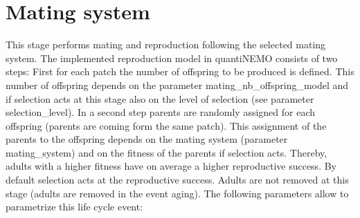 \documentclass[letterpaper,12pt,oneside]{book}
\begin{document}
\section{Mating system}\label{chap:breeding}
This stage performs mating and reproduction following the selected mating system. The implemented reproduction model in quantiNEMO consists of two steps: First for each patch the number of offspring to be produced is defined. This number of offspring depends on the parameter \textsf{mating\_nb\_offspring\_model} and if selection acts at this stage also on the level of selection (see parameter \textsf{selection\_level}). In a second step parents are randomly assigned for each offspring (parents are coming form the same patch). This assignment of the parents to the offspring depends on the mating system (parameter \textsf{mating\_system}) and on the fitness of the parents if selection acts. Thereby, adults with a higher fitness have on average a higher reproductive success. By default selection acts at the reproductive success. Adults are not removed at this stage (adults are removed in the event \textsf{aging}). The following parameters allow to parametrize this life cycle event:
 
\end{document}
